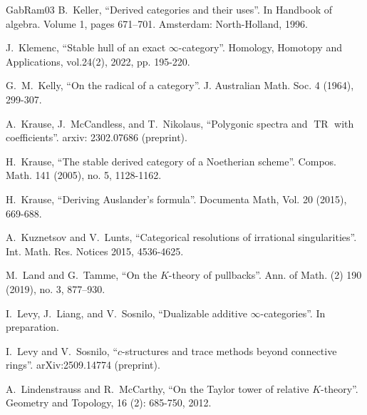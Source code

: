 \documentclass[11pt,leqno]{amsart}
\numberwithin{equation}{section}
\newcommand{\TR}{\operatorname{TR}}
\begin{document}
\begin{thebibliography}{GabRam03}
 B.~Keller, ``Derived categories and their uses''. In Handbook of algebra. Volume 1, pages
671–701. Amsterdam: North-Holland, 1996.

 J.~Klemenc, ``Stable hull of an exact $\infty$-category''. Homology, Homotopy and Applications, vol.24(2), 2022, pp. 195-220.

 G.~M.~Kelly, ``On the radical of a category''. J. Australian Math. Soc. 4 (1964), 299-307.



A.~Krause, J.~McCandless, and T.~Nikolaus, ``Polygonic spectra and $\TR$ with coefficients''. arxiv: 2302.07686 (preprint).

 H.~Krause, ``The stable derived category of a Noetherian scheme''. Compos. Math. 141
(2005), no. 5, 1128-1162.

 H.~Krause, ``Deriving Auslander's formula''. Documenta Math, Vol. 20 (2015), 669-688.

 A.~Kuznetsov and V.~Lunts, ``Categorical resolutions of irrational singularities''. Int. Math. Res. Notices 2015, 4536-4625.

 M.~Land and G.~Tamme, ``On the $K$-theory of pullbacks''. Ann. of Math. (2) 190 (2019), no. 3, 877–930.

 I.~Levy, J.~Liang, and V.~Sosnilo, ``Dualizable additive $\infty$-categories''. In preparation.

 I.~Levy and V.~Sosnilo, ``$c$-structures and trace methods beyond connective rings''. arXiv:2509.14774 (preprint).

 A.~Lindenstrauss and R.~McCarthy, ``On the Taylor tower of relative $K$-theory''. Geometry and Topology,
16 (2): 685-750, 2012.



\end{thebibliography}
\end{document}
